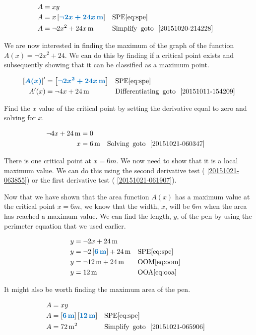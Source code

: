 \documentclass[20150903-160354-rs2.2-MarksMathNotebook.tex]{subfiles}
\begin{document}
\begin{example}[id:20151020-171605]
\begin{align*}
A & = xy \\
A &= x \farg{\neg 2x+24x \unit{m}} && \text{SPE} \eqref{eq:spe} \\
A &= \neg 2x^2+24x \unit{m} && \text{Simplify} \text{\, goto \,} \, \ref{20151020-214228}
\end{align*}

We are now interested in finding the maximum of the graph of the function $A(x)=\neg 2x^2+24$.  We can do this by finding if a critical point exists and subsequently showing that it can be classified as a maximum point.

\begin{align*}
\farg{A(x)}' & = \farg{\neg 2x^2+24x \unit{m}} && \text{SPE} \eqref{eq:spe} \\ 
A'(x) &= \neg 4x+ 24 \unit{m}  &&\text{Differentiating} \text{\, goto \,} \, \ref{20151011-154209} \\
\end{align*}

Find the $x$ value of the critical point by setting the derivative equal to zero and solving for $x$.

\begin{align*}
\neg 4x + 24 \, \mathrm{m} & = 0 \\
x &= 6 \, \mathrm{m}  &&\text{Solving} \text{\, goto \,} \, \ref{20151021-060347} \\
\end{align*}

There is one critical point at $x=6 \unit{m}$.  We now need to show that it is a local maximum value.  We can do this using the second derivative test ( \ref{20151021-063855}) or the first derivative test (  \ref{20151021-061907}).

Now that we have shown that the area function $A(x)$ has a maximum value at the critical point $x= 6\unit{m}$, we know that the width, $x$, will be $6 \unit{m}$ when the area has reached a maximum value.  We can find the length, $y$, of the pen by using the perimeter equation that we used earlier.

\begin{align*}
y &=  \neg 2x + 24 \unit{m} \\
y &=  \neg 2 \farg{6 \unit{m}} + 24 \unit{m} && \text{SPE} \eqref{eq:spe} \\
y &=  \neg 12 \unit{m} + 24 \unit{m} && \text{OOM} \eqref{eq:oom} \\
y &=  12 \unit{m} && \text{OOA} \eqref{eq:ooa} 
\end{align*}

It might also be worth finding the maximum area of the pen.

\begin{align*}
A &= xy \\
A &= \farg{6 \unit{m}}\farg{12 \unit{m}} && \text{SPE} \eqref{eq:spe} \\
A &= 72\unit{m}^2  &&\text{Simplify} \text{\, goto \,} \, \ref{20151021-065906} \\
\end{align*}

\end{example}
\end{document}
